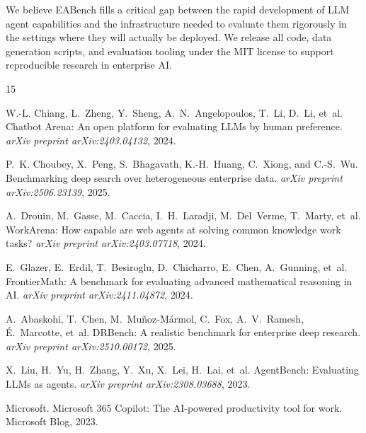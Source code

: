 \documentclass[10pt,twocolumn]{article}
\begin{document}
We believe EABench fills a critical gap between the rapid development of LLM
agent capabilities and the infrastructure needed to evaluate them rigorously in
the settings where they will actually be deployed.  We release all code, data
generation scripts, and evaluation tooling under the MIT license to support
reproducible research in enterprise AI.



\begin{thebibliography}{15}

W.-L. Chiang, L.~Zheng, Y.~Sheng, A.~N.~Angelopoulos, T.~Li, D.~Li, et~al.
\newblock Chatbot Arena: An open platform for evaluating LLMs by human
  preference.
\newblock \emph{arXiv preprint arXiv:2403.04132}, 2024.

P.~K. Choubey, X.~Peng, S.~Bhagavath, K.-H.~Huang, C.~Xiong, and C.-S.~Wu.
\newblock Benchmarking deep search over heterogeneous enterprise data.
\newblock \emph{arXiv preprint arXiv:2506.23139}, 2025.

A.~Drouin, M.~Gasse, M.~Caccia, I.~H.~Laradji, M.~Del~Verme, T.~Marty,
  et~al.
\newblock WorkArena: How capable are web agents at solving common knowledge
  work tasks?
\newblock \emph{arXiv preprint arXiv:2403.07718}, 2024.

E.~Glazer, E.~Erdil, T.~Besiroglu, D.~Chicharro, E.~Chen, A.~Gunning,
  et~al.
\newblock FrontierMath: A benchmark for evaluating advanced mathematical
  reasoning in AI.
\newblock \emph{arXiv preprint arXiv:2411.04872}, 2024.

A.~Abaskohi, T.~Chen, M.~Mu{\~n}oz-M{\'a}rmol, C.~Fox, A.~V.~Ramesh,
  {\'E}.~Marcotte, et~al.
\newblock DRBench: A realistic benchmark for enterprise deep research.
\newblock \emph{arXiv preprint arXiv:2510.00172}, 2025.

X.~Liu, H.~Yu, H.~Zhang, Y.~Xu, X.~Lei, H.~Lai, et~al.
\newblock AgentBench: Evaluating LLMs as agents.
\newblock \emph{arXiv preprint arXiv:2308.03688}, 2023.

Microsoft.
\newblock Microsoft 365 Copilot: The AI-powered productivity tool for work.
\newblock Microsoft Blog, 2023.


\end{thebibliography}
\end{document}
